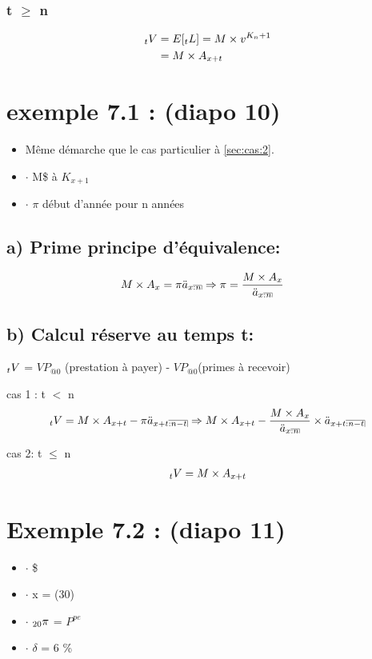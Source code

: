 \documentclass[11pt,french]{report}
\makeatletter
\DeclareRobustCommand{\annuity}[1]{%
\def\arraystretch{0}%
\setlength\arraycolsep{.7pt}%
\setlength\arrayrulewidth{.3pt}%
\begin{array}[b]{@{}c|}\hline
\\[\arraycolsep]%
\scriptstyle #1%
\end{array}%
}
\newcommand{\indiceGauche}[2]{{\vphantom{#2}}_{#1}#2}
\makeatother
\begin{document}
\subsubsection*{t $\geq$ n}
\begin{align*}
\indiceGauche{t}{V} &= E[\indiceGauche{t}{L}] = M \times v^{K_{n}+1} \\
&= M \times A_{x + t} 
\end{align*}


\section{exemple 7.1 : (diapo 10)}
\begin{itemize}
\item Même démarche que le cas particulier à \ref{sec:cas:2}.
\item $\cdot$ M\$ à $K_{x + 1}$
\item $\cdot$ $\pi$ début d'année pour n années
\end{itemize}
\subsection*{a) Prime principe d'équivalence:}
\begin{align*}
M\times A_x &= \pi \ddot{a}_{x\annuity{:n}} 
\Rightarrow 
\pi = \frac{M \times A_x}{\ddot{a}_{x\annuity{:n}}}
\end{align*}

\subsection*{b) Calcul réserve au temps t:} 
$\indiceGauche{t}{V}$ = $VP_{@0}$ (prestation à payer) - $VP_{@0}$(primes à recevoir)

cas 1 : t $<$ n
\begin{align*}
\indiceGauche{t}{V} = M\times A_{x+t} - \pi \ddot{a}_{x+t\annuity{:n-t}} \Rightarrow M\times A_{x+t} - \frac{M\times A_x}{\ddot{a}_{x\annuity{:n}}} \times \ddot{a}_{x+t\annuity{:n-t}}
\end{align*}

cas 2: t $\leq$ n
\begin{align*}
\indiceGauche{t}{V} = M\times A_{x+t}
\end{align*}


\section{Exemple 7.2 : (diapo 11)}
\begin{itemize}
\item $\cdot$  \$
\item $\cdot$ x = (30)
\item $\cdot$ $\indiceGauche{20}{\pi}$ = $P ^{pe}$
\item $\cdot$ $\delta$ = 6 \%
\end{itemize}
\end{document}
